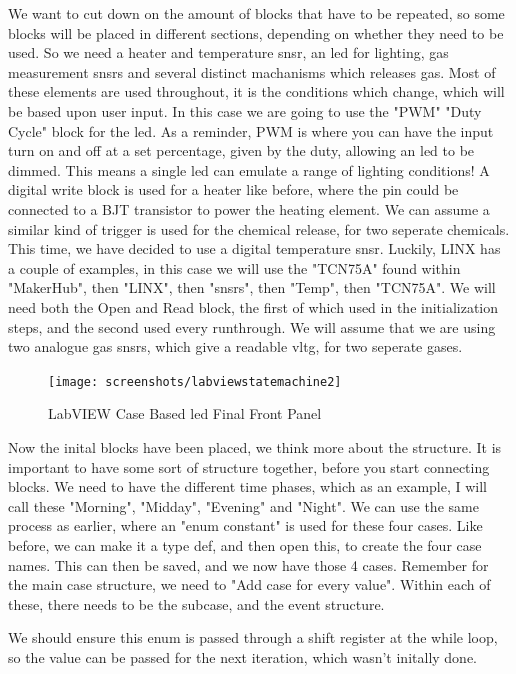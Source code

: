 \documentclass[a4paper,11pt]{report}
\begin{document}
We want to cut down on the amount of blocks that have to be repeated, so some blocks will be placed in different sections, depending on whether they need to be used. So we need a heater and temperature \gls{snsr}, an \gls{led} for lighting, gas measurement \gls{snsr}s and several distinct machanisms which releases gas. Most of these elements are used throughout, it is the conditions which change, which will be based upon user input. In this case we are going to use the "PWM" "Duty Cycle" block for the \gls{led}. As a reminder, PWM is where you can have the input turn on and off at a set percentage, given by the duty, allowing an \gls{led} to be dimmed. This means a single \gls{led} can emulate a range of lighting conditions! A digital write block is used for a heater like before, where the pin could be connected to a BJT transistor to power the heating element. We can assume a similar kind of trigger is used for the chemical release, for two seperate chemicals. This time, we have decided to use a digital temperature \gls{snsr}. Luckily, LINX has a couple of examples, in this case we will use the "TCN75A" found within "MakerHub", then "LINX", then "\gls{snsr}s", then "Temp", then "TCN75A". We will need both the Open and Read block, the first of which used in the initialization steps, and the second used every runthrough. We will assume that we are using two analogue gas \gls{snsr}s, which give a readable \gls{vltg}, for two seperate gases.

\begin{figure}[H]
\centering
\texttt{[image: screenshots/labviewstatemachine2]}
\caption{LabVIEW Case Based \gls{led} Final Front Panel}
\end{figure}

Now the inital blocks have been placed, we think more about the structure. It is important to have some sort of structure together, before you start connecting blocks. We need to have the different time phases, which as an example, I will call these "Morning", "Midday", "Evening" and "Night". We can use the same process as earlier, where an "enum constant" is used for these four cases. Like before, we can make it a type def, and then open this, to create the four case names. This can then be saved, and we now have those 4 cases. Remember for the main case structure, we need to "Add case for every value". Within each of these, there needs to be the subcase, and the event structure.

We should ensure this enum is passed through a shift register at the while loop, so the value can be passed for the next iteration, which wasn't initally done.
\end{document}
